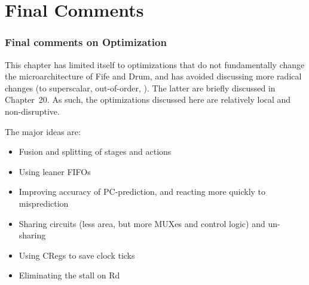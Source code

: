 
\section{Final Comments}

\begin{frame}[fragile]
\frametitle{Final comments on Optimization}

\footnotesize

This chapter has limited itself to optimizations that do not
fundamentally change the microarchitecture of Fife and Drum, and has
avoided discussing more radical changes (to superscalar, out-of-order,
{\etc}).  The latter are briefly discussed in Chapter~20.  As such,
the optimizations discussed here are relatively local and
non-disruptive.

\vxx

The major ideas are:

\begin{itemize}

 \item Fusion and splitting of stages and actions

 \item Using leaner FIFOs

 \item Improving accuracy of PC-prediction, and reacting more quickly to misprediction

 \item Sharing circuits (less area, but more MUXes and control logic) and un-sharing

 \item Using CRegs to save clock ticks

 \item Eliminating the stall on Rd

\end{itemize}

\end{frame}







